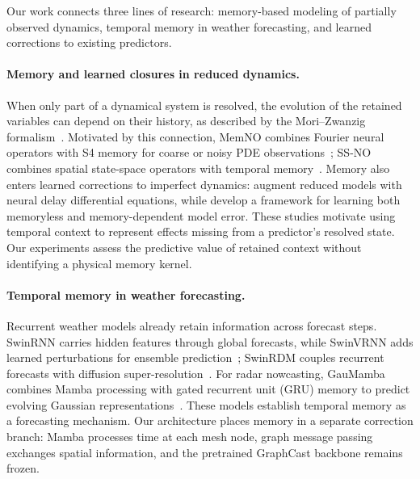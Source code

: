 \documentclass[11pt]{article}
\begin{document}
Our work connects three lines of research: memory-based modeling of partially observed dynamics, temporal memory in weather forecasting, and learned corrections to existing predictors.

\paragraph{Memory and learned closures in reduced dynamics.}
When only part of a dynamical system is resolved, the evolution of the retained variables can depend on their history, as described by the Mori--Zwanzig formalism~\citep{YenTingLinMZ2021}. Motivated by this connection, MemNO combines Fourier neural operators with S4 memory for coarse or noisy PDE observations~\citep{buitrago2025memory}; SS-NO combines spatial state-space operators with temporal memory~\citep{koren2025ssno}. Memory also enters learned corrections to imperfect dynamics: \citet{gupta2021neuralclosures} augment reduced models with neural delay differential equations, while \citet{levine2022modelerror} develop a framework for learning both memoryless and memory-dependent model error. These studies motivate using temporal context to represent effects missing from a predictor's resolved state. Our experiments assess the predictive value of retained context without identifying a physical memory kernel.

\paragraph{Temporal memory in weather forecasting.}
Recurrent weather models already retain information across forecast steps. SwinRNN carries hidden features through global forecasts, while SwinVRNN adds learned perturbations for ensemble prediction~\citep{hu2023swinvrnn}; SwinRDM couples recurrent forecasts with diffusion super-resolution~\citep{chen2023swinrdm}. For radar nowcasting, GauMamba combines Mamba processing with gated recurrent unit (GRU) memory to predict evolving Gaussian representations~\citep{wang2025gaumamba}. These models establish temporal memory as a forecasting mechanism. Our architecture places memory in a separate correction branch: Mamba processes time at each mesh node, graph message passing exchanges spatial information, and the pretrained GraphCast backbone remains frozen.
\end{document}

